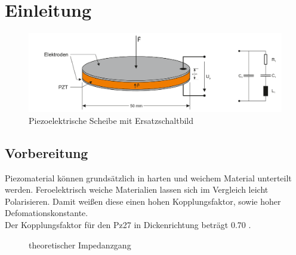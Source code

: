 \chapter{Einleitung} \label{Einleitung}



\begin{figure}[h]
    \centering
    \includegraphics[width=1 \textwidth]{image/Piezo_Skizze.png}
    \caption{Piezoelektrische Scheibe mit Ersatzschaltbild  \cite{laborpraktikum2022} }
\end{figure}

\section{Vorbereitung}

Piezomaterial können grundsätzlich in harten und weichem Material unterteilt werden. 
Feroelektrisch weiche Materialien lassen sich im Vergleich leicht Polarisieren. Damit weißen diese einen hohen Kopplungsfaktor, sowie hoher Defomationskonstante. \\
Der Kopplungsfaktor für den Pz27 in Dickenrichtung beträgt 0.70 . \\





\begin{figure}
    \centering
    
    \caption{theoretischer Impedanzgang}
\end{figure}